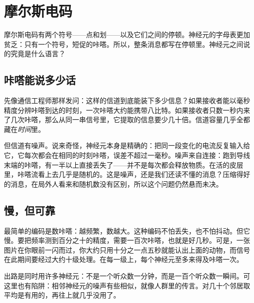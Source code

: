 \chapter{摩尔斯电码}

摩尔斯电码有两个符号——点和划——以及它们之间的停顿。神经元的字母表更加贫乏：只有一个符号，短促的咔嗒。所以，整条消息都写在停顿里。神经元之间说的究竟是什么语言？

\section*{咔嗒能说多少话}

先像通信工程师那样发问：这样的信道到底能装下多少信息？如果接收者能以毫秒精度分辨咔嗒到达的时刻，一次咔嗒大约能携带八比特。如果接收者只数一秒内来了几次咔嗒，那么从同一串信号里，它提取的信息要少几十倍。信道容量几乎全都藏在\emph{时间}里。


但信道有噪声。说来奇怪，神经元本身是精确的：把同一段变化的电流反复输入给它，它每次都会在相同的时刻咔嗒，误差不超过一毫秒。噪声来自连接：跑到导线末端的咔嗒，有一半以上直接丢失了——并不是每次都会释放物质。在活的皮层里，咔嗒流看上去几乎是随机的。这是噪声，还是我们还读不懂的消息？压缩得好的消息，在局外人看来和随机数没有区别，所以这个问题仍然悬而未决。

\section*{慢，但可靠}

最简单的编码是数咔嗒：越频繁，数越大。这种编码不怕丢失，也不怕抖动。但它慢。要把频率测到百分之十的精度，需要一百次咔嗒，也就是好几秒。可是，一张图片在你眼前一闪而过，你大约只用十分之一点五秒就能认出上面的动物，而信号在此期间要经过大约十级处理。在每一级上，每个神经元至多来得及咔嗒一次。

出路是同时用许多神经元：不是一个听众数一分钟，而是一百个听众数一瞬间。可这里也有陷阱：相邻神经元的噪声有些相似，就像人群里的传言。对几十个邻居取平均是有用的，再往上就几乎没用了。

